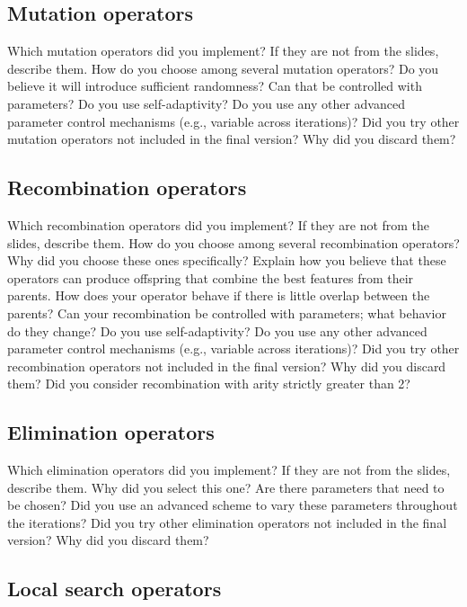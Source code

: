 \documentclass[a4paper,10pt]{article}
\newcommand{\ReplaceMe}[1]{{\color{blue}#1}}
\begin{document}
\subsection{Mutation operators}

\ReplaceMe{Which mutation operators did you implement? If they are not from the slides, describe them. How do you choose among several mutation operators? Do you believe it will introduce sufficient randomness? Can that be controlled with parameters? Do you use self-adaptivity? Do you use any other advanced parameter control mechanisms (e.g., variable across iterations)? Did you try other mutation operators not included in the final version? Why did you discard them?}

\subsection{Recombination operators}

\ReplaceMe{Which recombination operators did you implement? If they are not from the slides, describe them. How do you choose among several recombination operators? Why did you choose these ones specifically? Explain how you believe that these operators can produce offspring that combine the best features from their parents. How does your operator behave if there is little overlap between the parents? Can your recombination be controlled with parameters; what behavior do they change? Do you use self-adaptivity? Do you use any other advanced parameter control mechanisms (e.g., variable across iterations)? Did you try other recombination operators not included in the final version? Why did you discard them? Did you consider recombination with arity strictly greater than 2?}

\subsection{Elimination operators}

\ReplaceMe{Which elimination operators did you implement? If they are not from the slides, describe them. Why did you select this one? Are there parameters that need to be chosen? Did you use an advanced scheme to vary these parameters throughout the iterations? Did you try other elimination operators not included in the final version? Why did you discard them?} 

\subsection{Local search operators}
\end{document}

